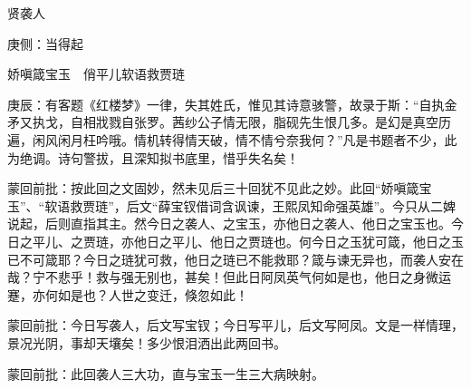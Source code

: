 

\begin{parag}
    贤袭人\begin{note}庚侧：当得起\end{note}娇嗔箴宝玉　俏平儿软语救贾琏
\end{parag}

\begin{parag}
    \begin{note}庚辰：有客题《红楼梦》一律，失其姓氏，惟见其诗意骇警，故录于斯：“自执金矛又执戈，自相戕戮自张罗。茜纱公子情无限，脂砚先生恨几多。是幻是真空历遍，闲风闲月枉吟哦。情机转得情天破，情不情兮奈我何？”凡是书题者不少，此为绝调。诗句警拔，且深知拟书底里，惜乎失名矣！\end{note}
\end{parag}


\begin{parag}
    \begin{note}蒙回前批：按此回之文固妙，然未见后三十回犹不见此之妙。此回“娇嗔箴宝玉”、“软语救贾琏”，后文“薛宝钗借词含讽谏，王熙凤知命强英雄”。今只从二婢说起，后则直指其主。然今日之袭人、之宝玉，亦他日之袭人、他日之宝玉也。今日之平儿、之贾琏，亦他日之平儿、他日之贾琏也。何今日之玉犹可箴，他日之玉已不可箴耶？今日之琏犹可救，他日之琏已不能救耶？箴与谏无异也，而袭人安在哉？宁不悲乎！救与强无别也，甚矣！但此日阿凤英气何如是也，他日之身微运蹇，亦何如是也？人世之变迁，倏忽如此！\end{note}
\end{parag}


\begin{parag}
    \begin{note}蒙回前批：今日写袭人，后文写宝钗；今日写平儿，后文写阿凤。文是一样情理，景况光阴，事却天壤矣！多少恨泪洒出此两回书。\end{note}
\end{parag}


\begin{parag}
    \begin{note}蒙回前批：此回袭人三大功，直与宝玉一生三大病映射。\end{note}
\end{parag}


